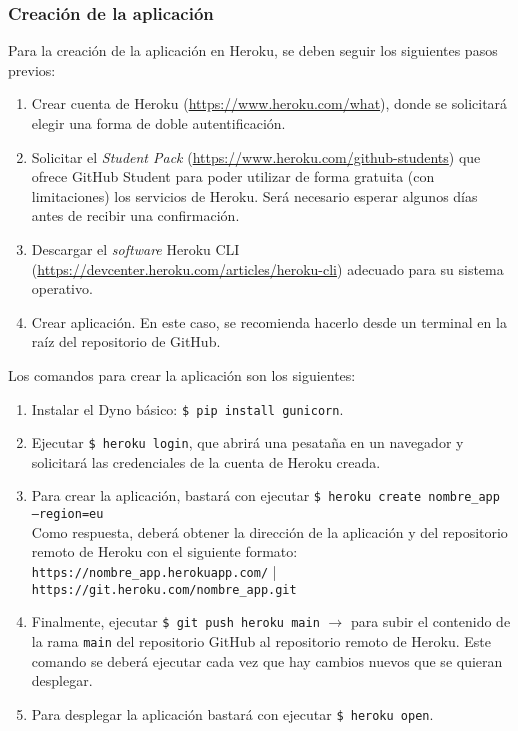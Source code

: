 \subsubsection{Creación de la aplicación}
Para la creación de la aplicación en Heroku, se deben seguir los siguientes pasos previos:

\begin{enumerate}
    \item Crear cuenta de Heroku (\url{https://www.heroku.com/what}), donde se solicitará elegir una forma de doble autentificación.
    \item Solicitar el \textit{Student Pack} (\url{https://www.heroku.com/github-students}) que ofrece GitHub Student para poder utilizar de forma gratuita (con limitaciones) los servicios de Heroku. Será necesario esperar algunos días antes de recibir una confirmación.
    \item Descargar el \textit{software} Heroku CLI (\url{https://devcenter.heroku.com/articles/heroku-cli}) adecuado para su sistema operativo.
    \item Crear aplicación. En este caso, se recomienda hacerlo desde un terminal en la raíz del repositorio de GitHub.
\end{enumerate}

Los comandos para crear la aplicación son los siguientes:

\begin{enumerate}
    \item Instalar el Dyno básico: \texttt{\$ pip install gunicorn}.
    
    \item Ejecutar \texttt{\$ heroku login}, que abrirá una pesataña en un navegador y solicitará las credenciales de la cuenta de Heroku creada.
    
    \item Para crear la aplicación, bastará con ejecutar \texttt{\$ heroku create nombre\_app --region=eu} \\
    Como respuesta, deberá obtener la dirección de la aplicación y del repositorio remoto de Heroku con el siguiente formato: \\
    \texttt{https://nombre\_app.herokuapp.com/} | \\\texttt{https://git.heroku.com/nombre\_app.git}
    
    \item Finalmente, ejecutar \texttt{\$ git push heroku main} $\to$ para subir el contenido de la rama \texttt{main} del repositorio GitHub al repositorio remoto de Heroku. Este comando se deberá ejecutar cada vez que hay cambios nuevos que se quieran desplegar.
    
    \item Para desplegar la aplicación bastará con ejecutar \texttt{\$ heroku open}.
\end{enumerate}

